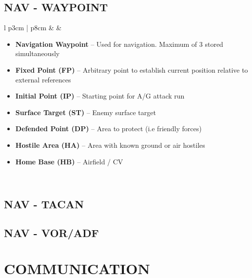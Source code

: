 \documentclass[fontHelvetica, widesubsec]{TechCheck}
\begin{document}
	\subsection{NAV - WAYPOINT}
	\begin{center}
		\begin{longtable}{l p{3cm} | p{8cm}}
			\toprule
			\textbf{\textbullet} &   &
			\begin{minipage}[t]{\linewidth}
				\vspace{-7pt}
				\begin{itemize}
					\item \textbf{Navigation Waypoint} -- Used for navigation. Maximum of 3 stored simultaneously
					\item \textbf{Fixed Point (FP)} -- Arbitrary point to establish current position relative to external references
					\item \textbf{Initial Point (IP)} -- Starting point for A/G attack run
					\item \textbf{Surface Target (ST)} -- Enemy surface target
					\item \textbf{Defended Point (DP)} -- Area to protect (i.e friendly forces)
					\item \textbf{Hostile Area (HA)} -- Area with known ground or air hostiles
					\item \textbf{Home Base (HB)} -- Airfield / CV
				\end{itemize}
			\end{minipage} \\
			\bottomrule
		\end{longtable}
	\end{center}

	\subsection{NAV - TACAN}
	\subsection{NAV - VOR/ADF}



	\cleardoublepage

	\section{COMMUNICATION}
\end{document}
